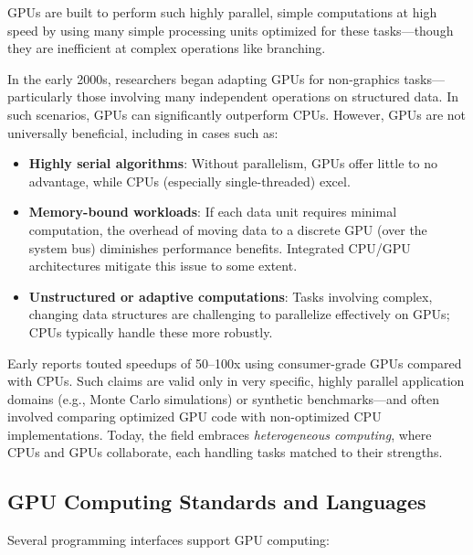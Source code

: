 \documentclass[11pt,a4paper]{book}
\begin{document}
GPUs are built to perform such highly parallel, simple computations at high speed by using many simple processing units optimized for these tasks—though they are inefficient at complex operations like branching.

In the early 2000s, researchers began adapting GPUs for non-graphics tasks—particularly those involving many independent operations on structured data. In such scenarios, GPUs can significantly outperform CPUs. However, GPUs are not universally beneficial, including in cases such as:

\begin{itemize}
  \item \textbf{Highly serial algorithms}: Without parallelism, GPUs offer little to no advantage, while CPUs (especially single-threaded) excel.
  \item \textbf{Memory-bound workloads}: If each data unit requires minimal computation, the overhead of moving data to a discrete GPU (over the system bus) diminishes performance benefits. Integrated CPU/GPU architectures mitigate this issue to some extent.
  \item \textbf{Unstructured or adaptive computations}: Tasks involving complex, changing data structures are challenging to parallelize effectively on GPUs; CPUs typically handle these more robustly.
\end{itemize}

Early reports touted speedups of 50–100x using consumer-grade GPUs compared with CPUs. Such claims are valid only in very specific, highly parallel application domains (e.g., Monte Carlo simulations) or synthetic benchmarks—and often involved comparing optimized GPU code with non-optimized CPU implementations. Today, the field embraces \emph{heterogeneous computing}, where CPUs and GPUs collaborate, each handling tasks matched to their strengths.

\subsection*{GPU Computing Standards and Languages}

Several programming interfaces support GPU computing:
\end{document}
